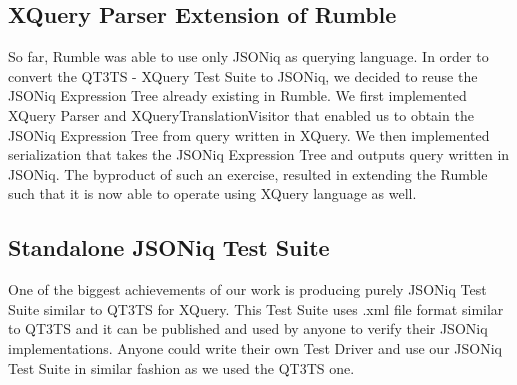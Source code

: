 \subsection{XQuery Parser Extension of Rumble}
So far, Rumble was able to use only JSONiq as querying language. In order to convert the QT3TS - XQuery Test Suite to JSONiq, we decided to reuse the JSONiq Expression Tree already existing in Rumble. We first implemented XQuery Parser and XQueryTranslationVisitor that enabled us to obtain the JSONiq Expression Tree from query written in XQuery. We then implemented serialization that takes the JSONiq Expression Tree and outputs query written in JSONiq. The byproduct of such an exercise, resulted in extending the Rumble such that it is now able to operate using XQuery language as well.

\subsection{Standalone JSONiq Test Suite}
One of the biggest achievements of our work is producing purely JSONiq Test Suite similar to QT3TS for XQuery. This Test Suite uses .xml file format similar to QT3TS and it can be published and used by anyone to verify their JSONiq implementations. Anyone could write their own Test Driver and use our JSONiq Test Suite in similar fashion as we used the QT3TS one.

